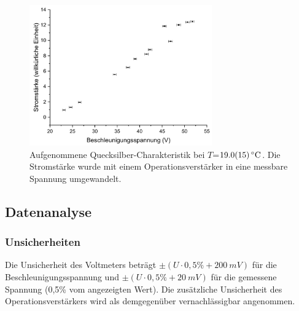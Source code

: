\documentclass[
	a4paper,
	12pt,
	pagesize,
	ngerman
]{scrartcl}
\begin{document}
	
	
	
	
	
	
	
	
	
	
	
	\begin{figure}[H]
		\includegraphics[width=0.7\textwidth]{Hg19}
		\centering
		\caption{Aufgenommene Quecksilber-Charakteristik bei $T$=$\SI{19,0 +- 1,5}{\degreeCelsius}$. Die Stromstärke wurde mit einem Operationsverstärker in eine messbare Spannung umgewandelt.}
		\label{Hg19}
		\centering
	\end{figure}
	
	\subsection{Datenanalyse}
	\subsubsection{Unsicherheiten}
	Die Unsicherheit des  Voltmeters beträgt $\pm (U \cdot 0,5\% + \SI{200}{mV})$ für die Beschleunigungsspannung und $\pm (U \cdot 0,5\% + \SI{20}{mV})$ für die gemessene Spannung (0,5\% vom angezeigten Wert).\cite{FH-Pforzheim} Die zusätzliche Unsicherheit des Operationsverstärkers wird als demgegenüber vernachlässigbar angenommen. 
	
\end{document}
